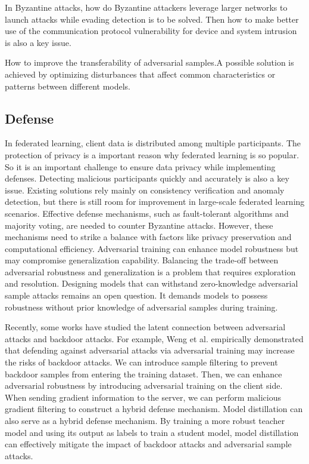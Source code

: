 \documentclass[conference]{IEEEtran}
\begin{document}
In Byzantine attacks,  how do Byzantine attackers leverage larger networks to launch attacks while evading detection is to be solved.  
Then how to make better use of the communication protocol vulnerability for device and system intrusion is also a key issue.

How to improve the transferability of adversarial samples.A possible solution is achieved by optimizing disturbances that affect common characteristics or patterns between different models.

\subsection{Defense}
In federated learning, client data is distributed among multiple participants. The protection of privacy is a important reason why federated learning is so popular. So it is an important challenge to ensure data privacy while implementing defenses.  
Detecting malicious participants quickly and accurately is also a key issue. Existing solutions rely mainly on consistency verification and anomaly detection, but there is still room for improvement in large-scale federated learning scenarios.  
Effective defense mechanisms, such as fault-tolerant algorithms and majority voting, are needed to counter Byzantine attacks. However, these mechanisms need to strike a balance with factors like privacy preservation and computational efficiency.
Adversarial training can enhance model robustness but may compromise generalization capability. Balancing the trade-off between adversarial robustness and generalization is a problem that requires exploration and resolution.
Designing models that can withstand zero-knowledge adversarial sample attacks remains an open question. It demands models to possess robustness without prior knowledge of adversarial samples during training.

Recently, some works have studied the latent connection between adversarial attacks and backdoor attacks.
For example, Weng et al. \cite{b66}empirically demonstrated that defending
against adversarial attacks via adversarial training may increase the risks of backdoor attacks.
We can introduce sample filtering to prevent backdoor samples from entering the training dataset. 
Then, we can enhance adversarial robustness by introducing adversarial training on the client side. 
When sending gradient information to the server, we can perform malicious gradient filtering to construct a hybrid defense mechanism.
Model distillation can also serve as a hybrid defense mechanism. 
By training a more robust teacher model and using its output as labels to train a student model, 
model distillation can effectively mitigate the impact of backdoor attacks and adversarial sample attacks.
\end{document}
